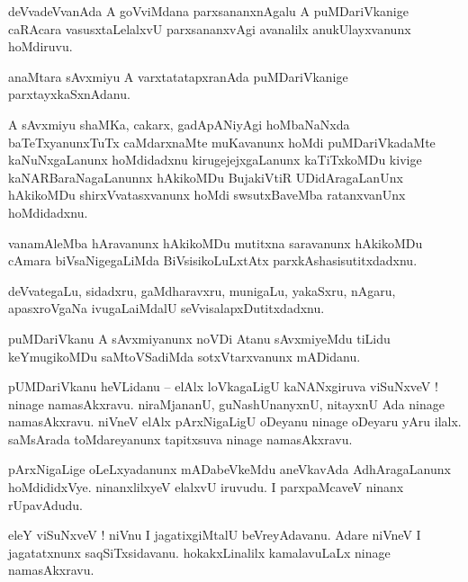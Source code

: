 \documentclass{article}
\begin{document}
\begin{mn}%
deVvadeVvanAda A goVviMdana parxsananxnAgalu A puMDariVkanige caRAcara vasusxtaLelalxvU 
parxsananxvAgi avanalilx anukUlayxvanunx hoMdiruvu.
\end{mn}

\begin{mn}%
anaMtara sAvxmiyu A varxtatatapxranAda puMDariVkanige parxtayxkaSxnAdanu.
\end{mn}

\begin{mn}%
A sAvxmiyu shaMKa, cakarx, gadApANiyAgi hoMbaNaNxda baTeTxyanunxTuTx caMdarxnaMte muKavanunx hoMdi 
puMDariVkadaMte kaNuNxgaLanunx hoMdidadxnu kirugejejxgaLanunx kaTiTxkoMDu kivige 
kaNARBaraNagaLanunnx hAkikoMDu BujakiVtiR UDidAragaLanUnx hAkikoMDu shirxVvatasxvanunx hoMdi 
swsutxBaveMba ratanxvanUnx hoMdidadxnu.
\end{mn}

\begin{mn}%
vanamAleMba hAravanunx hAkikoMDu mutitxna saravanunx hAkikoMDu cAmara biVsaNigegaLiMda 
BiVsisikoLuLxtAtx parxkAshasisutitxdadxnu. 
\end{mn}

\begin{mn}%
deVvategaLu, sidadxru, gaMdharavxru, munigaLu, yakaSxru, nAgaru, apasxroVgaNa ivugaLaiMdalU 
seVvisalapxDutitxdadxnu.
\end{mn}

\begin{mn}%
puMDariVkanu A sAvxmiyanunx noVDi Atanu sAvxmiyeMdu tiLidu keYmugikoMDu saMtoVSadiMda 
sotxVtarxvanunx mADidanu.
\end{mn}

\begin{mn}%
pUMDariVkanu heVLidanu -- elAlx loVkagaLigU kaNANxgiruva viSuNxveV ! ninage namasAkxravu. 
niraMjananU, guNashUnanyxnU, nitayxnU  Ada ninage namasAkxravu. niVneV elAlx pArxNigaLigU oDeyanu 
ninage oDeyaru yAru ilalx. saMsArada toMdareyanunx tapitxsuva ninage namasAkxravu.
\end{mn}

\begin{mn}%
pArxNigaLige oLeLxyadanunx mADabeVkeMdu aneVkavAda AdhAragaLanunx hoMdididxVye. ninanxlilxyeV 
elalxvU iruvudu. I parxpaMcaveV ninanx rUpavAdudu.
\end{mn}

\begin{mn}%
eleY viSuNxveV ! niVnu I jagatixgiMtalU beVreyAdavanu. Adare niVneV I jagatatxnunx saqSiTxsidavanu. 
hokakxLinalilx kamalavuLaLx ninage namasAkxravu.
\end{mn}
\end{document}
